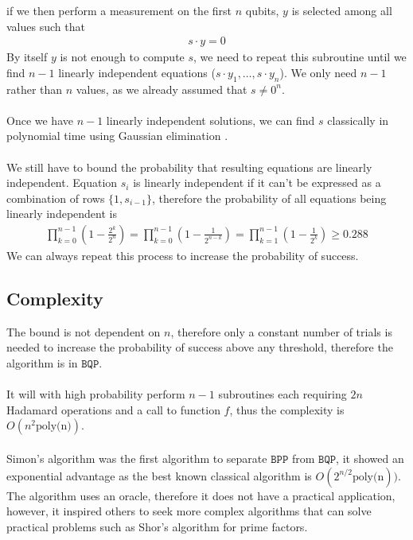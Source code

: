 if we then perform a measurement on the first $n$ qubits, $y$ is selected among all values such that
\begin{align*}
    s\cdot y = 0
\end{align*}
By itself $y$ is not enough to compute $s$, we need to repeat this subroutine until we find $n-1$ linearly independent equations ($s\cdot y_1,\dots ,s\cdot y_n$). We only need $n-1$ rather than $n$ values, as we already assumed that $s\neq 0^n$.\\\\
Once we have $n-1$ linearly independent solutions, we can find $s$ classically in polynomial time using Gaussian elimination \cite{cormen2009}.
\\\\
We still have to bound the probability that resulting equations are linearly independent. Equation $s_i$ is linearly independent if it can't be expressed as a combination of rows $\{1,s_{i-1}\}$, therefore the probability of all equations being linearly independent is  
\begin{align*}
    \prod_{k=0}^{n-1} \left(1-\frac{2^k}{2^n}\right)=\prod_{k=0}^{n-1} \left(1-\frac{1}{2^{n-k}}\right)=\prod_{k=1}^{n-1} \left(1-\frac{1}{2^{k}}\right) \geq 0.288
\end{align*}
We can always repeat this process to increase the probability of success.\subsection{Complexity}
The bound is not dependent on $n$, therefore only a constant number of trials is needed to increase the probability of success above any threshold, therefore the algorithm is in $\mathtt{BQP}$.\\\\
It will with high probability perform $n-1$ subroutines each requiring $2n$ Hadamard operations and a call to function $f$, thus the complexity is $O(n^2 \text{poly(n)})$.\\\\
Simon's algorithm was the first algorithm to separate $\mathtt{BPP}$  from $\mathtt{BQP}$, it showed an exponential advantage as the best known classical algorithm is $O(2^{n/2}\text{poly(n}))$. The algorithm uses an oracle, therefore it does not have a practical application, however, it inspired others to seek more complex algorithms that can solve practical problems such as Shor's algorithm for prime factors.
